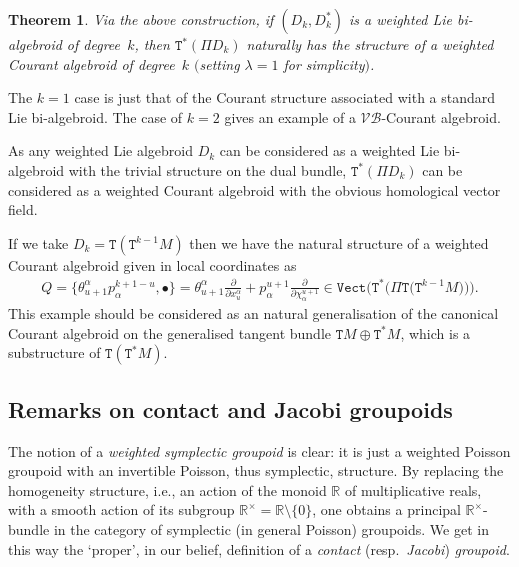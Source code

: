 \documentclass[10pt,a4paper]{amsart}
\def\Vect{\mathtt{Vect}}
\def\sT{{\mathtt T}}
\numberwithin{equation}{section}
\newtheorem{Theorem}{Theorem}[section]
\begin{document}
\begin{Theorem}
Via the above construction, if $(D_{k},D_{k}^{*})$ is a weighted Lie bi-algebroid of deg\-ree~$k$, then $\sT^{*}(\Pi D_{k})$ naturally has the structure of a weighted Courant algebroid of degree~$k$ $($setting $\lambda =1$ for simplicity$)$.
\end{Theorem}

\begin{Example}
The $k=1$ case is just that of the  Courant structure associated with a standard Lie bi-algebroid. The case of $k=2$ gives an example of a   $\mathcal{VB}$-Courant algebroid.
\end{Example}


\begin{Example}
As any weighted Lie algebroid $D_{k}$ can be considered as a weighted Lie bi-algebroid with the trivial structure on the dual bundle, $\sT^{*}(\Pi D_{k})$ can be considered as a weighted Courant algebroid with the obvious homological vector f\/ield.
\end{Example}

\begin{Example}
If we take $D_{k} = \sT(\sT^{k-1}M)$ then we have the natural structure of a weighted Courant algebroid given in local coordinates as
\begin{gather*}
Q =  \big\{ \theta_{u+1}^{\alpha} p_{\alpha}^{k+1-u}, \bullet \big\}= \theta_{u+1}^{\alpha}\frac{\partial}{\partial x^{\alpha}_{u} }  +   p_{\alpha}^{u+1}\frac{\partial }{\partial \chi_{\alpha}^{u+1} }  \in \Vect\big(\sT^{*}\big(\Pi \sT \big(\sT^{k-1} M\big)\big)\big).
\end{gather*}
  This example should be considered as an natural generalisation of the canonical Courant algebroid on the generalised tangent bundle $\sT M \oplus \sT^{*}M$, which is a substructure of $\sT(\sT^{*}M)$.
\end{Example}


\subsection{Remarks on contact and Jacobi groupoids}

The notion of a \emph{weighted symplectic groupoid} is clear: it is just a weighted Poisson groupoid with an invertible Poisson, thus symplectic, structure.
By replacing  the homogeneity structure, i.e., an action of the monoid ${\mathbb R}$ of multiplicative reals, with a smooth action of its subgroup $\mathbb{R}^{\times}={\mathbb R}{\setminus}\{ 0\}$, one obtains a principal $\mathbb{R}^{\times}$-bundle in the category of symplectic (in general Poisson)  groupoids. We get in this way the `proper', in our belief, def\/inition of a \emph{contact} (resp.\ \emph{Jacobi}) \emph{groupoid}.
\end{document}
